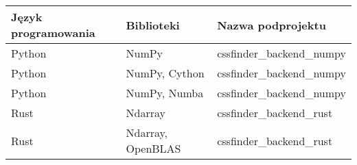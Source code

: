 \begin{tabularx}{\textwidth}{l|l|l}
  \hline \textbf{Język programowania} & \hspace{1.5cm} \textbf{Biblioteki}                    & \hspace{1cm} \textbf{Nazwa podprojektu}              \\ \hline
  \hspace{0.5cm} Python               & \hspace{0.5cm} NumPy                   \hspace{0.5cm} & \hspace{0.7cm} cssfinder\_backend\_numpy  \\
  \hspace{0.5cm} Python               & \hspace{0.5cm} NumPy, Cython           \hspace{0.5cm} & \hspace{0.7cm} cssfinder\_backend\_numpy  \\
  \hspace{0.5cm} Python               & \hspace{0.5cm} NumPy, Numba            \hspace{0.5cm} & \hspace{0.7cm} cssfinder\_backend\_numpy  \\
  \hspace{0.5cm} Rust                 & \hspace{0.5cm} Ndarray                 \hspace{0.5cm} & \hspace{0.7cm} cssfinder\_backend\_rust   \\
  \hspace{0.5cm} Rust                 & \hspace{0.5cm} Ndarray, OpenBLAS       \hspace{0.5cm} & \hspace{0.7cm} cssfinder\_backend\_rust   \\ \hline
\end{tabularx}